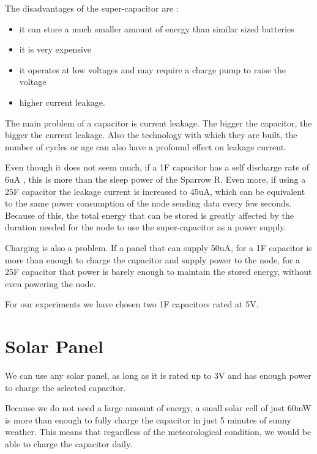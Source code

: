 The disadvantages of the super-capacitor are :

\begin{itemize}
\item it can store a much smaller amount of energy than similar sized batteries
\item it is very expensive
\item it operates at low voltages and may require a charge pump to raise the voltage
\item higher current leakage.

\end{itemize}

The main problem of a capacitor is current leakage. The bigger the capacitor, the bigger the
current leakage. Also the technology with which they are built, the number of cycles or age can
also have a profound effect on leakage current.

Even though it does not seem much, if a 1F capacitor has a self discharge rate of 6uA
\cite{ultracap}, this is more than the sleep power of the Sparrow R. Even more, if using a 25F
capacitor the leakage current is increased to 45uA, which can be equivalent to the same power
consumption of the node sending data every few seconds. Because of this, the total energy that can
be stored is greatly affected by the duration needed for the node to use the super-capacitor as a
power supply.

Charging is also a problem. If a panel that can supply 50uA, for a 1F capacitor is more than enough to charge
the capacitor and supply power to the node, for a 25F capacitor that power is barely enough
to maintain the stored energy, without even powering the node.

For our experiments we have chosen two 1F capacitors rated at 5V.

\section{Solar Panel}

We can use any solar panel, as long as it is rated up to 3V and has enough power to charge the
selected capacitor.

Because we do not need a large amount of energy, a small solar cell of just 60mW is more than
enough to fully charge the capacitor in just 5 minutes of sunny weather. This means that regardless
of the meteorological condition, we would be able to charge the capacitor daily.

